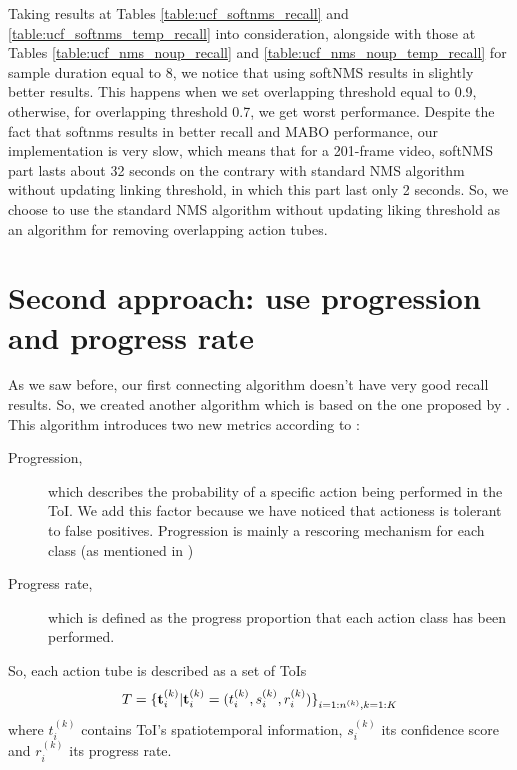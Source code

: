 Taking results at Tables \ref{table:ucf_softnms_recall} and \ref{table:ucf_softnms_temp_recall} into consideration, alongside with those
at Tables \ref{table:ucf_nms_noup_recall} and \ref{table:ucf_nms_noup_temp_recall} for sample duration equal to 8, we notice that
using softNMS results in slightly better results. This happens when we set overlapping threshold equal to 0.9, otherwise, for
overlapping threshold 0.7, we get worst performance. Despite the fact that softnms results in better recall and MABO performance,
our implementation is very slow, which means that for a 201-frame video, softNMS part lasts about 32 seconds on the contrary with
standard NMS algorithm without updating linking threshold, in which this part last only 2 seconds. So, we choose to use the standard NMS
algorithm without updating liking threshold as an algorithm for  removing overlapping action tubes.

\section{Second approach: use progression and progress rate}
As we saw before, our first connecting algorithm doesn't have very good recall results. So, we created another algorithm which is based on
the one proposed by \cite{DBLP:journals/corr/abs-1903-00304}. This
algorithm introduces two new metrics according to \cite{DBLP:journals/corr/abs-1903-00304}:

\begin{description}
\item[ Progression,  ] which describes the probability of a specific action being performed in the ToI. 
  We add this factor because we have noticed that actioness is tolerant to false positives. Progression is
  mainly a rescoring mechanism for each class (as mentioned in \cite{DBLP:journals/corr/abs-1903-00304})

\item [ Progress rate, ] which is defined as the progress proportion that each action class has been performed.
  
\end{description}

So, each action tube is described as a set of ToIs
\[  T = {\{ {\bf t}_i^{(k)} | {\bf t}_i^{(k)} = ( t_i^{(k)}, s_i^{(k)}, r_i^{(k)} ) \}}_{i=1:n^{(k)},k=1:K} \]
where $ t_i^{(k)} $ contains ToI's spatiotemporal information, $ s_i^{(k)} $ its confidence score and $ r_i^{(k)} $ its progress rate.

